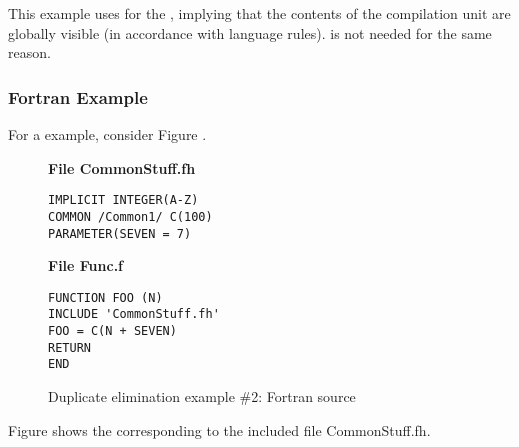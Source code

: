 This example uses  for the ,
implying that the contents of the compilation unit are
globally visible (in accordance with 
 language rules).
 is not needed for the same reason.

\subsubsection{Fortran Example}


For a 
example, consider 
Figure .

\begin{figure}
\textbf{File CommonStuff.fh}
\begin{lstlisting}[numbers=none]
IMPLICIT INTEGER(A-Z)
COMMON /Common1/ C(100)
PARAMETER(SEVEN = 7)
\end{lstlisting}

\textbf{File Func.f}
\begin{lstlisting}[numbers=none]
FUNCTION FOO (N)
INCLUDE 'CommonStuff.fh'
FOO = C(N + SEVEN)
RETURN
END
\end{lstlisting}
\caption{Duplicate elimination example \#2: Fortran source} 
\label{fig:duplicateeliminationexample2fortransource}
\end{figure}


Figure 
shows the 
corresponding to the included file 
CommonStuff.fh.

